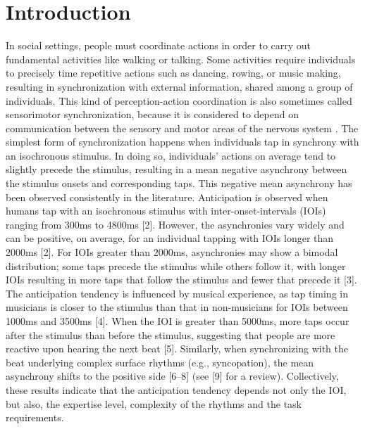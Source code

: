 \documentclass{report}
\begin{document}
\section{Introduction}
     In social settings, people must coordinate actions in order to carry out fundamental activities like walking or talking. Some activities require individuals to precisely time repetitive actions such as dancing, rowing, or music making, resulting in synchronization with external information, shared among a group of individuals. This kind of perception-action coordination is also sometimes called sensorimotor synchronization, because it is considered to depend on communication between the sensory and motor areas of the nervous system \cite{oullier2005neural}. The simplest form of synchronization happens when individuals tap in synchrony with an isochronous stimulus. In doing so, individuals’ actions on average tend to slightly precede the stimulus, resulting in a mean negative asynchrony between the stimulus onsets and corresponding taps. This negative mean asynchrony has been observed consistently in the literature. Anticipation is observed when humans tap with an isochronous stimulus with inter-onset-intervals (IOIs) ranging from 300ms to 4800ms [2]. However, the asynchronies vary widely and can be positive, on average, for an individual tapping with IOIs longer than 2000ms [2]. For IOIs greater than 2000ms, asynchronies may show a bimodal distribution; some taps precede the stimulus while others follow it, with longer IOIs resulting in more taps that follow the stimulus and fewer that precede it [3]. The anticipation tendency is influenced by musical experience, as tap timing in musicians is closer to the stimulus than that in non-musicians for IOIs between 1000ms and 3500ms [4]. When the IOI is greater than 5000ms, more taps occur after the stimulus than before the stimulus, suggesting that people are more reactive upon hearing the next beat [5]. Similarly, when synchronizing with the beat underlying complex surface rhythms (e.g., syncopation), the mean asynchrony shifts to the positive side [6–8] (see [9] for a review). Collectively, these results indicate that the anticipation tendency depends not only the IOI, but also, the expertise level, complexity of the rhythms and the task requirements.
\end{document}
